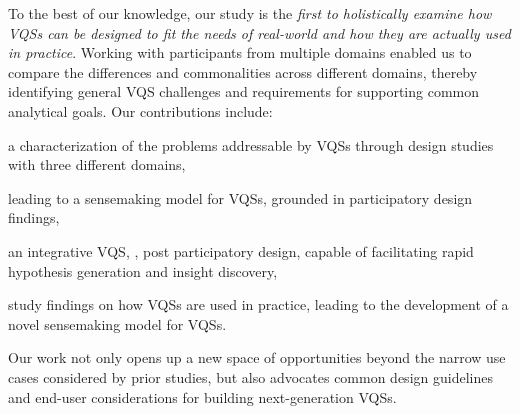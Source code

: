  \par To the best of our knowledge, our study is the \emph{first to holistically examine how VQSs can be designed to fit the needs of real-world  and how they are actually used in practice}. Working with participants from multiple domains enabled us to compare the differences and commonalities across different domains, thereby identifying general VQS challenges and requirements for supporting common analytical goals. Our contributions include:
 \begin{denselist}
 \item a characterization of the problems addressable by VQSs through design studies with three different domains,
 \item {} leading to a sensemaking model for VQSs, grounded in participatory design findings, %
 \item an integrative VQS, \zvpp, post participatory design, capable of facilitating rapid hypothesis generation and insight discovery,
 \item study findings on how VQSs are used in practice, leading to the development of a novel sensemaking model for VQSs. %
 \end{denselist}
 Our work not only opens up a new space of opportunities beyond the narrow use cases considered by prior studies, but also advocates common design guidelines and end-user considerations for building next-generation VQSs.